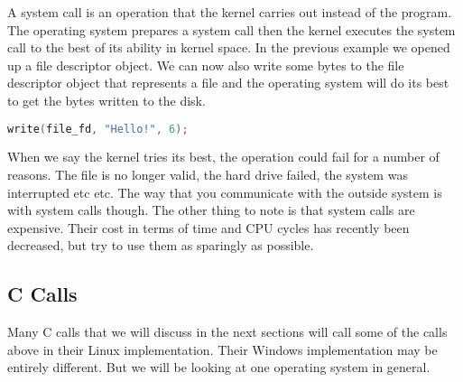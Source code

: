 A system call is an operation that the kernel carries out instead of the program.
The operating system prepares a system call then the kernel executes the system call to the best of its ability in kernel space.
In the previous example we opened up a file descriptor object.
We can now also write some bytes to the file descriptor object that represents a file and the operating system will do its best to get the bytes written to the disk.

\begin{lstlisting}[language=C]
write(file_fd, "Hello!", 6);
\end{lstlisting}

When we say the kernel tries its best, the operation could fail for a number of reasons. The file is no longer valid, the hard drive failed, the system was interrupted etc etc.
The way that you communicate with the outside system is with system calls though.
The other thing to note is that system calls are expensive.
Their cost in terms of time and CPU cycles has recently been decreased, but try to use them as sparingly as possible.

\subsection{C Calls}

Many C calls that we will discuss in the next sections will call some of the calls above in their Linux implementation.
Their Windows implementation may be entirely different.
But we will be looking at one operating system in general.



